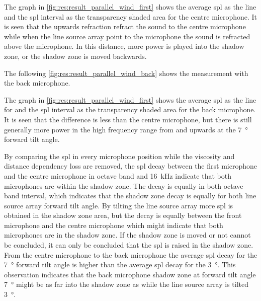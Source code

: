  
 The graph in \autoref{fig:res:result_parallel_wind_first} shows the average \gls{spl} as the line  and the \gls{spl} interval as the transparency shaded area for the centre microphone. It is seen that the upwards refraction refract the sound to the centre microphone while when the line source array point to the microphone the sound is refracted above the microphone. In this distance, more power is played into the shadow zone, or the shadow zone is moved backwards. 

The following \autoref{fig:res:result_parallel_wind_back} shows the measurement with the back microphone.
 
 
  
   
The graph in \autoref{fig:res:result_parallel_wind_first} shows the average \gls{spl} as the line for and the \gls{spl} interval as the transparency shaded area for the back microphone. It is seen that the difference is less than the centre microphone, but there is still generally more power in the high frequency range from  and upwards at the \SI{7}{\degree} forward tilt angle.   


By comparing the \gls{spl} in every microphone position while the viscosity and distance dependency loss are removed, the \gls{spl} decay between the first microphone and the centre microphone in octave band  and \SI{16}{\kilo\hertz} indicate that both microphones are within the shadow zone. The decay is equally in both octave band interval, which indicates that the shadow zone decay is equally for both line source array forward tilt angle. By tilting the line source array more \gls{spl} is obtained in the shadow zone area, but the decay is equally between the front microphone and the centre microphone which might indicate that both microphones are in the shadow zone. If the shadow zone is moved or not cannot be concluded, it can only be concluded that the \gls{spl} is raised in the shadow zone. 
From the centre microphone to the back microphone the average \gls{spl} decay for the \SI{7}{\degree} forward tilt angle is higher than the average \gls{spl} decay for the \SI{3}{\degree}. This observation indicates that the back microphone shadow zone at forward tilt angle \SI{7}{\degree} might be as far into the shadow zone as while the line source array is tilted \SI{3}{\degree}.